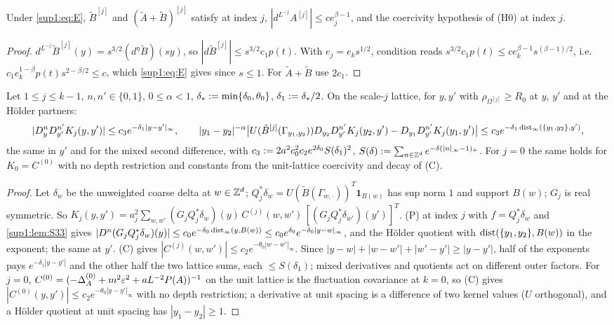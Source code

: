 \begin{lemma}\label{sup1:lem:S33}
Under \eqref{sup1:eq:E}, $\tilde B^{[j]}$ and $(\tilde A+\tilde B)^{[j]}$ satisfy \cite[(2.23)]{Ba1} at index $j$, $|d^{L^{-j}}A^{[j]}|\le ce_j^{\beta-1}$, and the coercivity hypothesis of (H0) at index $j$.
\end{lemma}

\begin{proof}
$d^{L^{-j}}\tilde B^{[j]}(y)=s^{3/2}(d^\eta\tilde B)(sy)$, so $|d\tilde B^{[j]}|\le s^{3/2}c_1p(t)$. With $e_j=e_ks^{1/2}$, condition \cite[(2.23)]{Ba1} reads $s^{3/2}c_1p(t)\le ce_k^{\beta-1}s^{(\beta-1)/2}$, i.e.\ $c_1e_k^{1-\beta}p(t)s^{2-\beta/2}\le c$, which \eqref{sup1:eq:E} gives since $s\le1$. For $\tilde A+\tilde B$ use $2c_1$.
\end{proof}

\begin{lemma}\label{sup1:lem:S34}
Let $1\le j\le k-1$, $n,n'\in\{0,1\}$, $0\le\alpha<1$, $\delta_*:=\min\{\delta_0,\theta_0\}$, $\delta_1:=\delta_*/2$. On the scale-$j$ lattice, for $y,y'$ with $\rho_{\Omega^{[j]}}\ge R_0$ at $y$, $y'$ and at the H\"older partners:
\[
|D^n_yD^{n'}_{y'}K_j(y,y')|\le c_3e^{-\delta_1|y-y'|_\infty},\qquad |y_1-y_2|^{-\alpha}\big|U(\tilde B^{[j]}(\Gamma_{y_1,y_2}))D_{y_2}D^{n'}_{y'}K_j(y_2,y')-D_{y_1}D^{n'}_{y'}K_j(y_1,y')\big|\le c_3e^{-\delta_1\operatorname{dist}_\infty(\{y_1,y_2\},y')},
\]
the same in $y'$ and for the mixed second difference, with $c_3:=2a^2c_0^2c_2e^{2\delta_0}S(\delta_1)^2$, $S(\delta):=\sum_{n\in\mathbb Z^d}e^{-\delta(|n|_\infty-1)_+}$. For $j=0$ the same holds for $K_0=C^{(0)}$ with no depth restriction and constants from the unit-lattice coercivity and decay of (C).
\end{lemma}

\begin{proof}
Let $\delta_w$ be the unweighted coarse delta at $w\in\mathbb Z^d$; $Q_j^*\delta_w=U(\tilde B(\Gamma_{w,\cdot}))^T\mathbf 1_{B(w)}$ has sup norm $1$ and support $B(w)$; $G_j$ is real symmetric. So $K_j(y,y')=a_j^2\sum_{w,w'}(G_jQ_j^*\delta_w)(y)\,C^{(j)}(w,w')\,[(G_jQ_j^*\delta_{w'})(y')]^T$. (P) at index $j$ with $f=Q_j^*\delta_w$ and \cref{sup1:lem:S33} gives $|D^n(G_jQ_j^*\delta_w)(y)|\le c_0e^{-\delta_0\operatorname{dist}_\infty(y,B(w))}\le c_0e^{\delta_0}e^{-\delta_0|y-w|_\infty}$, and \cite[(2.24)]{Ba1} the H\"older quotient with $\operatorname{dist}(\{y_1,y_2\},B(w))$ in the exponent; the same at $y'$. (C) gives $|C^{(j)}(w,w')|\le c_2e^{-\theta_0|w-w'|_\infty}$. Since $|y-w|+|w-w'|+|w'-y'|\ge|y-y'|$, half of the exponents pays $e^{-\delta_1|y-y'|}$ and the other half the two lattice sums, each $\le S(\delta_1)$; mixed derivatives and quotients act on different outer factors. For $j=0$, $C^{(0)}=(-\Delta^{(0)}_A+m^2\varepsilon^2+aL^{-2}P(A))^{-1}$ on the unit lattice is the fluctuation covariance at $k=0$, so (C) gives $|C^{(0)}(y,y')|\le c_2e^{-\theta_0|y-y'|_\infty}$ with no depth restriction; a derivative at unit spacing is a difference of two kernel values ($U$ orthogonal), and a H\"older quotient at unit spacing has $|y_1-y_2|\ge1$.
\end{proof}


